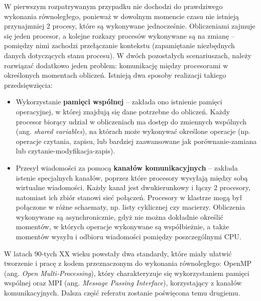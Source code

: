 W pierwszym rozpatrywanym przypadku nie dochodzi do prawdziwego wykonania równoległego, ponieważ w dowolnym momencie czasu nie istnieją przynajmniej 2 procesy, które są wykonywane jednocześnie. Obliczeniami zajmuje się jeden procesor, a kolejne rozkazy procesów wykonywane są na zmianę -- pomiędzy nimi zachodzi przełączanie kontekstu (zapamiętanie niezbędnych danych dotyczących stanu procesu). W dwóch pozostałych scenariuszach, należy rozwiązać dodatkowo jeden problem: komunikację między procesorami w określonych momentach obliczeń. Istnieją dwa sposoby realizacji takiego przedsięwzięcia:

\begin{itemize}
	\item Wykorzystanie \textbf{pamięci wspólnej} -- zakłada ono istnienie pamięci operacyjnej, w której znajdują się dane potrzebne do obliczeń. Każdy procesor biorący udział w obliczeniach ma dostęp do zmiennych wspólnych (ang. \textit{shared variables}), na którach może wykonywać określone operacje (np. operacje czytania, zapisu, lub bardziej zaawansowane jak porównanie-zamiana lub czytanie-modyfikacja-zapis).
	\item Przesył wiadomości za pomocą \textbf{kanałów komunikacyjnych} -- zakłada istenie specjalnych kanałów, poprzez które procesory wysyłają między sobą wirtualne wiadomości. Każdy kanał jest dwukierunkowy i łączy 2 procesory, natomiast ich zbiór stanowi sieć połączeń. Procesory w klastrze mogą był połączone w różne schaematy, np. listy cyklicznej czy macierzy. Obliczenia wykonywane są asynchronicznie, gdyż nie można dokładnie określić momentów, w których operacje wykonywane są współbieżnie, a także momentów wysyłu i odbioru wiadomości pomiędzy poszczególnymi CPU.
\end{itemize}

W latach 90-tych XX wieku powstały dwa standardy, które miały ułatwić tworzenie i pracę z kodem przeznaczonym do wykonania równoległego: OpenMP (ang. \textit{Open Multi-Processing}), który charakteryzuje się wykorzystaniem pamięci wspólnej oraz MPI (ang. \textit{Message Passing Interface}), korzystający z kanałów komunikacyjnych. Dalsza część referatu zostanie poświęcona temu drugiemu.